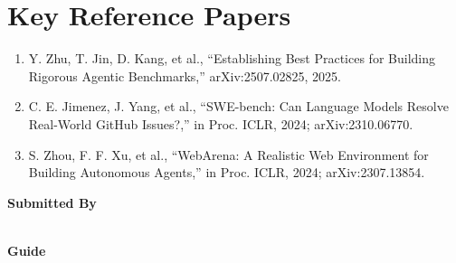 \documentclass[11pt]{article}
\begin{document}
\section*{Key Reference Papers}
\begin{enumerate}
  \item Y. Zhu, T. Jin, D. Kang, et al., ``Establishing Best Practices for Building Rigorous Agentic Benchmarks,'' arXiv:2507.02825, 2025.
  \item C. E. Jimenez, J. Yang, et al., ``SWE-bench: Can Language Models Resolve Real-World GitHub Issues?,'' in Proc. ICLR, 2024; arXiv:2310.06770.
  \item S. Zhou, F. F. Xu, et al., ``WebArena: A Realistic Web Environment for Building Autonomous Agents,'' in Proc. ICLR, 2024; arXiv:2307.13854.
\end{enumerate}
\vspace{0.8em}
\noindent\textbf{Submitted By}\\
\seminarName\\
\seminarRoll

\vspace{0.6em}
\noindent\textbf{Guide}\\
\seminarGuide
\end{document}

